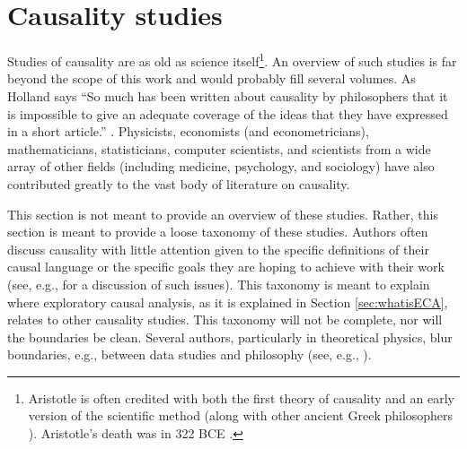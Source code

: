 \documentclass{article}[10pt]
\begin{document}
\section{Causality studies} 
\label{sec:studies}
Studies of causality are as old as science itself\footnote{Aristotle is often credited with both the first theory of causality \cite{Falcon2008,Evans1959} and an early version of the scientific method \cite{Bolduan1945} (along with other ancient Greek philosophers \cite{Popper1998}).  Aristotle's death was in 322 BCE \cite{During1957}.}.  An overview of such studies is far beyond the scope of this work and would probably fill several volumes.  As Holland says ``So much has been written about causality by philosophers that it is impossible to give an adequate coverage of the ideas that they have expressed in a short article.'' \cite{Holland1986}.  Physicists, economists (and econometricians), mathematicians, statisticians, computer scientists, and scientists from a wide array of other fields (including medicine, psychology, and sociology) have also contributed greatly to the vast body of literature on causality.  

This section is not meant to provide an overview of these studies.  Rather, this section is meant to provide a loose taxonomy of these studies.  Authors often discuss causality with little attention given to the specific definitions of their causal language or the specific goals they are hoping to achieve with their work (see, e.g., \cite{Holland1986,Granger1980} for a discussion of such issues).  This taxonomy is meant to explain where exploratory causal analysis, as it is explained in Section \ref{sec:whatisECA}, relates to other causality studies.  This taxonomy will not be complete, nor will the boundaries be clean.  Several authors, particularly in theoretical physics, blur boundaries, e.g., between data studies and philosophy (see, e.g., \cite{Bunge1979}).
\end{document}
